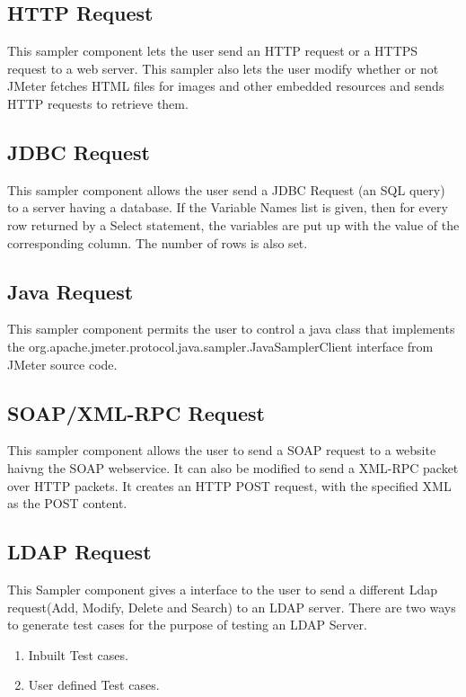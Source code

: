 \documentclass[12pt]{book}
\begin{document}
  \subsection{HTTP Request}
  This sampler component lets the user send an HTTP request or a HTTPS request to a web server. This sampler also lets the user modify whether 
  or not JMeter fetches HTML files for images and other embedded resources and sends HTTP requests to retrieve them.
  
  \subsection{JDBC Request}
  This sampler component allows the user send a JDBC Request (an SQL query) to a server having a database. If the Variable Names list is given,
  then for every   row returned by a Select statement, the variables are put up with the value of the corresponding column.
  The number of rows is also set.
  
  \subsection{Java Request}
  This sampler component permits the user to control a java class that implements the org.apache.jmeter.protocol.java.sampler.JavaSamplerClient
  interface from JMeter source code.

  
  \subsection{SOAP/XML-RPC Request}
  This sampler component allows the user to send a SOAP request to a website haivng the SOAP webservice. It can also be modified to send a XML-RPC
  packet over HTTP packets. It creates an HTTP POST request, with the specified XML as the POST content. 
  
  \subsection{LDAP Request}
  This Sampler component gives a interface to the user to send a different Ldap request(Add, Modify, Delete and Search) to an LDAP server.
  There are two ways to generate test cases for the purpose of testing an LDAP Server.
  \begin{enumerate}
   \item Inbuilt Test cases.
   \item User defined Test cases.
  \end{enumerate}
\end{document}
